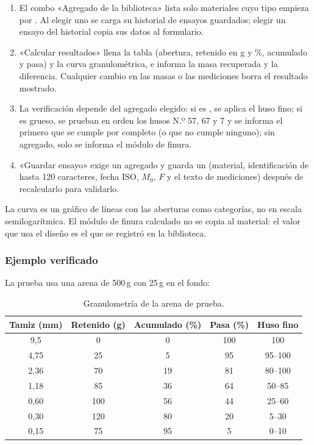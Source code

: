 \begin{enumerate}
	\item El combo «Agregado de la biblioteca» lista solo materiales cuyo tipo empieza por . Al elegir
	      uno se carga su historial de ensayos guardados; elegir un ensayo del historial copia sus datos al formulario.
	\item «Calcular resultados» llena la tabla (abertura, retenido en g y \%, acumulado y pasa) y la curva granulométrica,
	      e informa la masa recuperada y la diferencia. Cualquier cambio en las masas o las mediciones borra el resultado
	      mostrado.
	\item La verificación depende del agregado elegido: si es , se aplica el huso fino; si es
	      grueso, se prueban en orden los husos N.º 57, 67 y 7 y se informa el primero que se cumple por completo (o que
	      no cumple ninguno); sin agregado, solo se informa el módulo de finura.
	\item «Guardar ensayo» exige un agregado y guarda un  (material, identificación de
	      hasta 120 caracteres, fecha ISO, $M_0$, $F$ y el texto de mediciones) después de recalcularlo para validarlo.
\end{enumerate}

La curva es un gráfico de líneas con las aberturas como categorías, no en escala semilogarítmica. El módulo de finura
calculado no se copia al material: el valor que usa el diseño es el que se registró en la biblioteca.

\subsubsection{Ejemplo verificado}

La prueba  usa una arena de 500\,g con 25\,g en el fondo:

\begin{table}[H]
	\centering
	\caption{Granulometría de la arena de prueba.}
	\label{tab:con-ejemplo-granulometria}
	\begin{tabular}{ccccc}
		\hline
		\textbf{Tamiz (mm)} & \textbf{Retenido (g)} & \textbf{Acumulado (\%)} & \textbf{Pasa (\%)} & \textbf{Huso fino} \\ \hline
		9,5 & 0 & 0 & 100 & 100 \\
		4,75 & 25 & 5 & 95 & 95--100 \\
		2,36 & 70 & 19 & 81 & 80--100 \\
		1,18 & 85 & 36 & 64 & 50--85 \\
		0,60 & 100 & 56 & 44 & 25--60 \\
		0,30 & 120 & 80 & 20 & 5--30 \\
		0,15 & 75 & 95 & 5 & 0--10 \\
		\hline
	\end{tabular}
\end{table}


